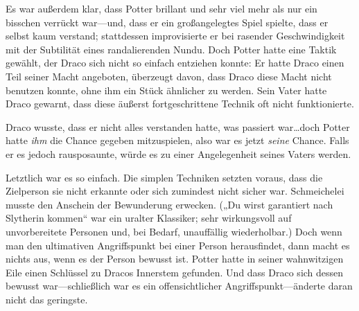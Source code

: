 Es war außerdem klar, dass Potter brillant und sehr viel mehr als nur ein bisschen verrückt war—und, dass er ein großangelegtes Spiel spielte, dass er selbst kaum verstand; stattdessen improvisierte er bei rasender Geschwindigkeit mit der Subtilität eines randalierenden Nundu. Doch Potter hatte eine Taktik gewählt, der Draco sich nicht so einfach entziehen konnte: Er hatte Draco einen Teil seiner Macht angeboten, überzeugt davon, dass Draco diese Macht nicht benutzen konnte, ohne ihm ein Stück ähnlicher zu werden. Sein Vater hatte Draco gewarnt, dass diese äußerst fortgeschrittene Technik oft nicht funktionierte.

Draco wusste, dass er nicht alles verstanden hatte, was passiert war…doch Potter hatte \emph{ihm} die Chance gegeben mitzuspielen, also war es jetzt \emph{seine} Chance. Falls er es jedoch rausposaunte, würde es zu einer Angelegenheit seines Vaters werden.

Letztlich war es so einfach. Die simplen Techniken setzten voraus, dass die Zielperson sie nicht erkannte oder sich zumindest nicht sicher war. Schmeichelei musste den Anschein der Bewunderung erwecken. („Du wirst garantiert nach Slytherin kommen“ war ein uralter Klassiker; sehr wirkungsvoll auf unvorbereitete Personen und, bei Bedarf, unauffällig wiederholbar.) Doch wenn man den ultimativen Angriffspunkt bei einer Person herausfindet, dann macht es nichts aus, wenn es der Person bewusst ist. Potter hatte in seiner wahnwitzigen Eile einen Schlüssel zu Dracos Innerstem gefunden. Und dass Draco sich dessen bewusst war—schließlich war es ein offensichtlicher Angriffspunkt—änderte daran nicht das geringste.

